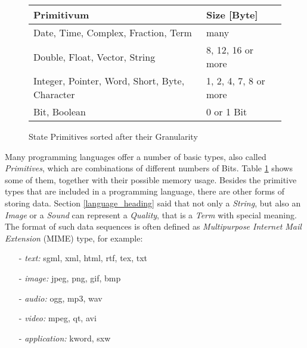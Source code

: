 \begin{figure}[ht]
    \begin{center}
        \begin{footnotesize}
        \begin{tabular}{| p{70mm} | p{35mm} |}
            \hline
            \textbf{Primitivum} & \textbf{Size} [Byte]\\
            \hline
            Date, Time, Complex, Fraction, Term & many\\
            \hline
            Double, Float, Vector, String & 8, 12, 16 or more\\
            \hline
            Integer, Pointer, Word, Short, Byte, Character & 1, 2, 4, 7, 8 or more\\
            \hline
            Bit, Boolean & 0 or 1 Bit\\
            \hline
        \end{tabular}
        \end{footnotesize}
        \caption{State Primitives sorted after their Granularity}
        \label{primitives_table}
    \end{center}
\end{figure}

Many programming languages offer a number of basic types, also called
\emph{Primitives}, which are combinations of different numbers of Bits. Table
\ref{primitives_table} shows some of them, together with their possible memory
usage. Besides the primitive types that are included in a programming language,
there are other forms of storing data. Section \ref{language_heading} said that
not only a \emph{String}, but also an \emph{Image} or a \emph{Sound} can
represent a \emph{Quality}, that is a \emph{Term} with special meaning. The
format of such data sequences is often defined as
\emph{Multipurpose Internet Mail Extension} (MIME) type, for example:

\begin{itemize}
    \item[-] \emph{text:} sgml, xml, html, rtf, tex, txt
    \item[-] \emph{image:} jpeg, png, gif, bmp
    \item[-] \emph{audio:} ogg, mp3, wav
    \item[-] \emph{video:} mpeg, qt, avi
    \item[-] \emph{application:} kword, sxw
\end{itemize}
